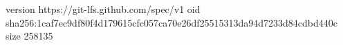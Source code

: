 version https://git-lfs.github.com/spec/v1
oid sha256:1caf7ec9df80f4d179615cfc057ca70e26df25515313da94d7233d84cdbd440c
size 258135
